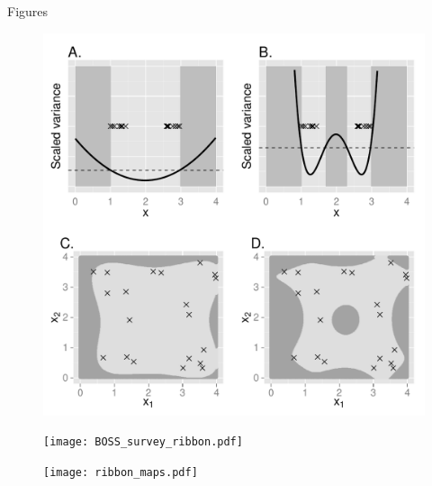 \documentclass[12pt,english]{article}
\begin{document}
\begin{spacing}{1.9}
\clearpage
\centerline{\sc Figures}




\begin{figure}[!h]
\begin{center}
\includegraphics[width=6in]{IVH_simple2.pdf}
\end{center}
\caption{ }
\label{fig:IVH}
\end{figure}

\begin{figure}[!h]
\begin{center}
\texttt{[image: BOSS\_survey\_ribbon.pdf]}
\end{center}
\caption{ }
\label{fig:flights}
\end{figure}


\begin{figure}[!h]
\begin{center}
\texttt{[image: ribbon\_maps.pdf]}
\end{center}
\caption{ }
\label{fig:ribbon_plot}
\end{figure}



\clearpage

\end{spacing}
\end{document}
